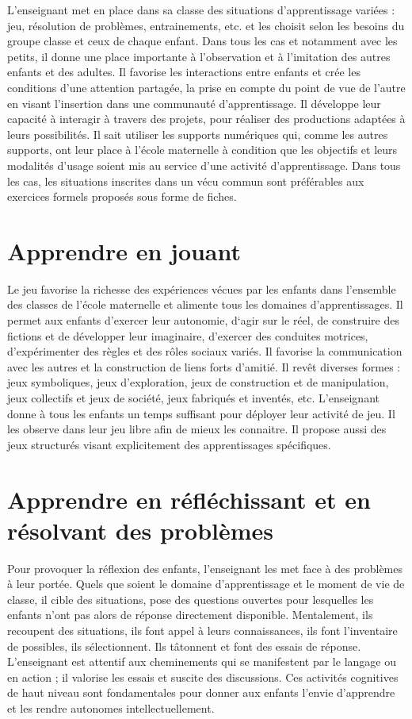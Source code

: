 L’enseignant met en place dans sa classe des situations d’apprentissage variées : jeu, résolution de problèmes, entrainements, etc. et les choisit selon les besoins du groupe classe et ceux de chaque enfant. Dans tous les cas et notamment avec les petits, il donne une place importante à l’observation et à l’imitation des autres enfants et des adultes. Il favorise les interactions entre enfants et crée les conditions d’une attention partagée, la prise en compte du point de vue de l’autre en visant l’insertion dans une communauté d’apprentissage. Il développe leur capacité à interagir à travers des projets, pour réaliser des productions adaptées à leurs possibilités. Il sait utiliser les supports numériques qui, comme les autres supports, ont leur place à l’école maternelle à condition que les objectifs et leurs modalités d’usage soient mis au service d’une activité d’apprentissage. Dans tous les cas, les situations inscrites dans un vécu commun sont préférables aux exercices formels proposés sous forme de fiches.

\section{Apprendre en jouant}
Le jeu favorise la richesse des expériences vécues par les enfants dans l'ensemble des classes de l’école maternelle et alimente tous les domaines d’apprentissages. Il permet aux enfants d’exercer leur autonomie, d‘agir sur le réel, de construire des fictions et de développer leur imaginaire, d’exercer des conduites motrices, d’expérimenter des règles et des rôles sociaux variés. Il favorise la communication avec les autres et la construction de liens forts d’amitié. Il revêt diverses formes : jeux symboliques, jeux d’exploration, jeux de construction et de manipulation, jeux collectifs et jeux de société, jeux fabriqués et inventés, etc. L’enseignant donne à tous les enfants un temps suffisant pour déployer leur activité de jeu. Il les observe dans leur jeu libre afin de mieux les connaitre. Il propose aussi des jeux structurés visant explicitement des apprentissages spécifiques. 

\section{Apprendre en réfléchissant et en résolvant des problèmes}
Pour provoquer la réflexion des enfants, l’enseignant les met face à des problèmes à leur portée. Quels que soient le domaine d’apprentissage et le moment de vie de classe, il cible des situations, pose des questions ouvertes pour lesquelles les enfants n’ont pas alors de réponse directement disponible. Mentalement, ils recoupent des situations, ils font appel à leurs connaissances, ils font l’inventaire de possibles, ils sélectionnent. Ils tâtonnent et font des essais de réponse. L’enseignant est attentif aux cheminements qui se manifestent par le langage ou en action ; il valorise les essais et suscite des discussions. Ces activités cognitives de haut niveau sont fondamentales pour donner aux enfants l’envie d’apprendre et les rendre autonomes intellectuellement.

